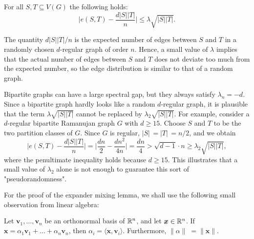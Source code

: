 \begin{lemma}
    For all $S, T \subseteq V(G)$ the following holds:
    \begin{equation*}
        \bigg| e(S, T) - \frac{d |S||T|}{n} \bigg| \le \lambda \sqrt{|S| |T|}.
    \end{equation*}
\end{lemma}

The quantity $d|S||T|/n$ is the expected number of edges between $S$ and $T$ in a randomly chosen $d$-regular graph of order $n$.
Hence, a small value of $\lambda$ implies that the actual number of edges between $S$ and $T$ does not deviate too much from the expected number, so the edge distribution is similar to that of a random graph.

\begin{remark}
    Bipartite graphs can have a large spectral gap, but they always satisfy $\lambda_n = -d$.
    Since a bipartite graph hardly looks like a random $d$-regular graph, it is plausible that the term $\lambda \sqrt{|S||T|}$ cannot be replaced by $\lambda_2 \sqrt{|S||T|}$.
    For example, consider a \mbox{$d$-regular} bipartite Ramanujan graph $G$ with $d \ge 15$. 
    Choose $S$ and $T$ to be the two partition classes of $G$.
    Since $G$ is regular, $|S|\, = |T|\, = n/2$, and we obtain %
    \begin{equation*}
        \bigg| e(S, T) - \frac{d |S||T|}{n} \bigg| = \bigg| \frac{dn}{2} - \frac{d n^2}{4n} \bigg| = \frac{dn}{4} > \sqrt{d - 1} \cdot n \ge \lambda_2 \sqrt{|S| |T|},
    \end{equation*}
    where the penultimate inequality holds because $d \ge 15$.
    This illustrates that a small value of $\lambda_2$ alone is not enough to guarantee this sort of "pseudorandomness".
\end{remark}

For the proof of the expander mixing lemma, we shall use the following small observation from linear algebra:
\begin{observation} \label{observation:scalarproducts}
    Let $\bm{v}_1, \dots, \bm{v}_n$ be an orthonormal basis of $\mathbb{R}^n$, and let $\bm{x} \in \mathbb{R}^n$. 
    If $\bm{x} = \alpha_1 \bm{v}_1 + \dots + \alpha_n \bm{v}_n$, then $\alpha_i = \langle \bm{x}, \bm{v}_i \rangle$.
    Furthermore, $\| \alpha \|\; = \| \bm{x} \|$.
\end{observation}

